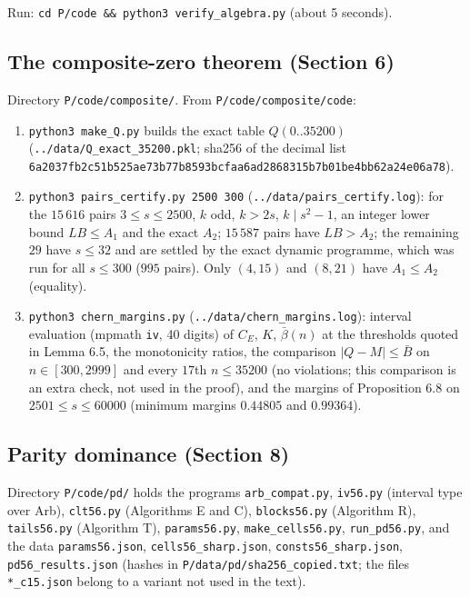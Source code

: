 Run: \texttt{cd\ P/code\ \&\&\ python3\ verify\_algebra.py} (about 5 seconds).

\subsection{The composite-zero theorem (Section 6)}\label{the-composite-zero-theorem-section-6}

Directory \texttt{P/code/composite/}. From \texttt{P/code/composite/code}:

\begin{enumerate}
\def\labelenumi{\arabic{enumi}.}
\tightlist
\item
  \texttt{python3\ make\_Q.py} builds the exact table \(Q(0..35200)\) (\texttt{../data/Q\_exact\_35200.pkl}; sha256 of the decimal list \texttt{6a2037fb2c51b525ae73b77b8593bcfaa6ad2868315b7b01be4bb62a24e06a78}).
\item
  \texttt{python3\ pairs\_certify.py\ 2500\ 300} (\texttt{../data/pairs\_certify.log}): for the \(15\,616\) pairs \(3\le s\le2500\), \(k\) odd, \(k>2s\), \(k\mid s^2-1\), an integer lower bound \(LB\le A_1\) and the exact \(A_2\); \(15\,587\) pairs have \(LB>A_2\); the remaining \(29\) have \(s\le32\) and are settled by the exact dynamic programme, which was run for all \(s\le300\) (\(995\) pairs). Only \((4,15)\) and \((8,21)\) have \(A_1\le A_2\) (equality).
\item
  \texttt{python3\ chern\_margins.py} (\texttt{../data/chern\_margins.log}): interval evaluation (mpmath \texttt{iv}, 40 digits) of \(C_E\), \(K\), \(\bar\beta(n)\) at the thresholds quoted in Lemma 6.5, the monotonicity ratios, the comparison \(|Q-M|\le\bar B\) on \(n\in[300,2999]\) and every \(17\)th \(n\le35200\) (no violations; this comparison is an extra check, not used in the proof), and the margins of Proposition 6.8 on \(2501\le s\le60000\) (minimum margins \(0.44805\) and \(0.99364\)).
\end{enumerate}

\subsection{Parity dominance (Section 8)}\label{parity-dominance-section-8}

Directory \texttt{P/code/pd/} holds the programs \texttt{arb\_compat.py}, \texttt{iv56.py} (interval type over Arb), \texttt{clt56.py} (Algorithms E and C), \texttt{blocks56.py} (Algorithm R), \texttt{tails56.py} (Algorithm T), \texttt{params56.py}, \texttt{make\_cells56.py}, \texttt{run\_pd56.py}, and the data \texttt{params56.json}, \texttt{cells56\_sharp.json}, \texttt{consts56\_sharp.json}, \texttt{pd56\_results.json} (hashes in \texttt{P/data/pd/sha256\_copied.txt}; the files \texttt{*\_c15.json} belong to a variant not used in the text).

